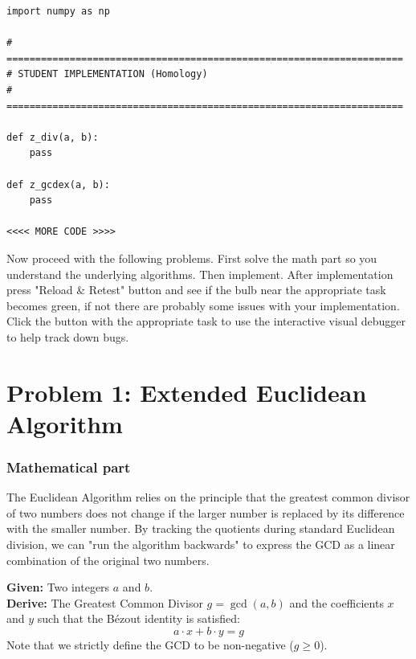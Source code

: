 \documentclass[11pt]{article}
\begin{document}
\begin{lstlisting}
import numpy as np

# =====================================================================
# STUDENT IMPLEMENTATION (Homology)
# =====================================================================

def z_div(a, b):
    pass

def z_gcdex(a, b):
    pass

<<<< MORE CODE >>>>
\end{lstlisting}

Now proceed with the following problems. First solve the math part so you understand the underlying algorithms. Then implement. After implementation press "Reload \& Retest" button and see if the bulb near the appropriate task becomes green, if not there are probably some issues with your implementation. Click the button with the appropriate task to use the interactive visual debugger to help track down bugs.



\section*{Problem 1: Extended Euclidean Algorithm}

\subsubsection*{Mathematical part}
The Euclidean Algorithm relies on the principle that the greatest common divisor of two numbers does not change if the larger number is replaced by its difference with the smaller number. By tracking the quotients during standard Euclidean division, we can "run the algorithm backwards" to express the GCD as a linear combination of the original two numbers.

\textbf{Given:} Two integers $a$ and $b$. \\
\textbf{Derive:} The Greatest Common Divisor $g = \gcd(a, b)$ and the coefficients $x$ and $y$ such that the Bézout identity is satisfied:
$$a \cdot x + b \cdot y = g$$
Note that we strictly define the GCD to be non-negative ($g \ge 0$).
\end{document}
